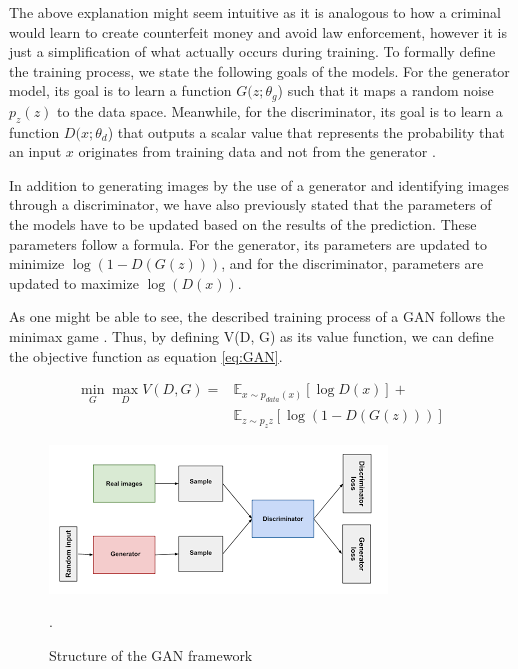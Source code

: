\documentclass[peerreview]{IEEEtran}
\begin{document}
The above explanation might seem intuitive as it is analogous to how a criminal would learn to create counterfeit money and avoid law enforcement, however it is just a simplification of what actually occurs during training. To formally define the training process, we state the following goals of the models. For the generator model, its goal is to learn a function $G(z;\theta_g$) such that it maps a random noise $p_z(z)$ to the data space. Meanwhile, for the discriminator, its goal is to learn a function $D(x;\theta_d$) that outputs a scalar value that represents the probability that an input $x$ originates from training data and not from the generator \cite{goodfellow2014generative}. 

In addition to generating images by the use of a generator and identifying images through a discriminator, we have also previously stated that the parameters of the models have to be updated based on the results of the prediction. These parameters follow a formula. For the generator, its parameters are updated to minimize $\log{(1-D(G(z)))}$, and for the discriminator, parameters are updated to maximize $\log{(D(x))}$. 

As one might be able to see, the described training process of a GAN follows the minimax game \cite{goodfellow2014generative}. Thus, by defining V(D, G) as its value function, we can define the objective function as equation \ref{eq:GAN}.

\begin{equation} \label{eq:GAN}
\begin{split}
\min_{G} \max_{D} V(D, G) = & \mathbb{E}_{x \sim p_{data}(x)} \left[ \log{D(x)} \right] + \\
&\mathbb{E}_{z\sim p_z{z}}\left[ \log{(1-D(G(z)))}\right]
\end{split}
\end{equation}

\begin{figure}[t]
\centering
\includegraphics[width=0.8\columnwidth]{GAN.png} 
\caption{Structure of the GAN framework \cite{googledevelopers2019ganstructureimage}}.
\label{fig:GAN}
\end{figure}
\end{document}
